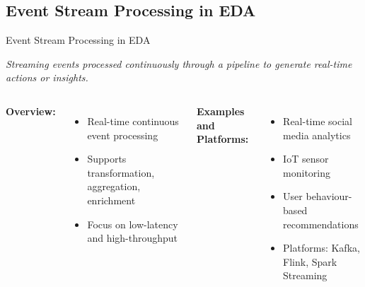 \documentclass[aspectratio=169, table]{beamer}
\begin{document}
	\subsection{Event Stream Processing in EDA}
	\begin{frame}[fragile]{Event Stream Processing in EDA}
		\vspace{20pt}
		\centering
		
		\vspace{10pt}
		\scriptsize \textit{Streaming events processed continuously through a pipeline to generate real-time actions or insights.}
		
		\vspace{15pt}
		\begin{columns}[T]
			\textbf{Overview:}
			\begin{itemize}
				\item Real-time continuous event processing
				\item Supports transformation, aggregation, enrichment
				\item Focus on low-latency and high-throughput
			\end{itemize}
			
			\textbf{Examples and Platforms:}
			\begin{itemize}
				\item Real-time social media analytics
				\item IoT sensor monitoring
				\item User behaviour-based recommendations
				\item Platforms: Kafka, Flink, Spark Streaming
			\end{itemize}
		\end{columns}
	\end{frame}
	
\end{document}

